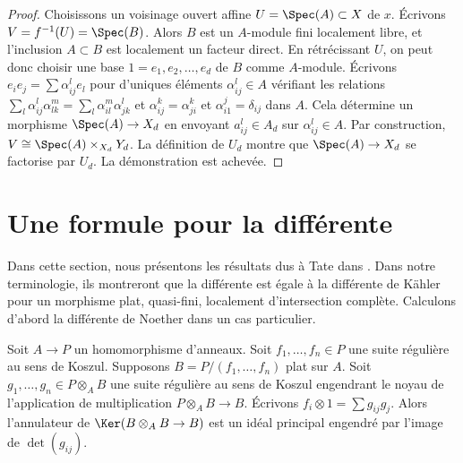 \begin{proof}
Choisissons un voisinage ouvert affine $U = \Spec(A) \subset X$ de $x$.
Écrivons $V = f^{-1}(U) = \Spec(B)$. Alors $B$ est un
$A$-module fini localement libre, et l'inclusion $A \subset B$ est localement un facteur direct.
En rétrécissant $U$, on peut donc choisir une base $1 = e_1, e_2, \ldots, e_d$
de $B$ comme $A$-module. Écrivons
$e_i e_j = \sum \alpha_{ij}^l e_l$ pour d'uniques
éléments $\alpha_{ij}^l \in A$ vérifiant les relations
$\sum_l \alpha_{ij}^l \alpha_{lk}^m = \sum_l \alpha_{il}^m \alpha _{jk}^l$
et $\alpha_{ij}^k = \alpha_{ji}^k$ et $\alpha_{i1}^j = \delta_{ij}$
dans $A$. Cela détermine un morphisme $\Spec(A) \to X_d$ en envoyant
$a_{ij}^l \in A_d$ sur $\alpha_{ij}^l \in A$. Par construction,
$V \cong \Spec(A) \times_{X_d} Y_d$. La définition de $U_d$
montre que $\Spec(A) \to X_d$ se factorise par $U_d$.
La démonstration est achevée.
\end{proof}










\section{Une formule pour la différente}
\label{section-formula-different}

\noindent
Dans cette section, nous présentons les résultats dus à Tate dans \cite[appendice A]{Mazur-Roberts}.
Dans notre terminologie, ils montreront que la différente est
égale à la différente de Kähler pour un morphisme plat, quasi-fini,
localement d'intersection complète.
Calculons d'abord la différente de Noether dans un cas particulier.

\begin{lemma}
\label{lemma-tate}
\begin{reference}
\cite[appendice]{Mazur-Roberts}
\end{reference}
Soit $A \to P$ un homomorphisme d'anneaux. Soit $f_1, \ldots, f_n \in P$ une
suite régulière au sens de Koszul. Supposons $B = P/(f_1, \ldots, f_n)$
plat sur $A$. Soit $g_1, \ldots, g_n \in P \otimes_A B$
une suite régulière au sens de Koszul engendrant le noyau de l'application de multiplication
$P \otimes_A B \to B$. Écrivons $f_i \otimes 1 = \sum g_{ij} g_j$.
Alors l'annulateur de $\Ker(B \otimes_A B \to B)$ est un idéal principal
engendré par l'image de $\det(g_{ij})$.
\end{lemma}

